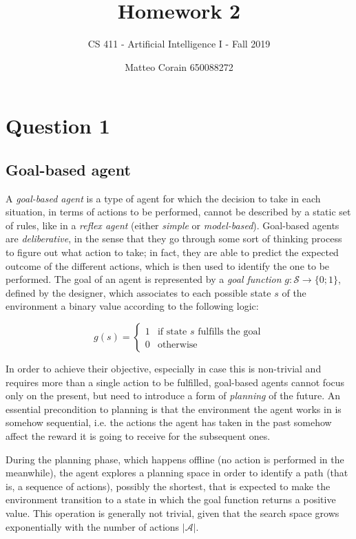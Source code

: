 \documentclass[letterpaper,headings=standardclasses]{scrartcl}
\title{Homework 2}
\subtitle{CS 411 - Artificial Intelligence I - Fall 2019}
\author{Matteo Corain 650088272}
\begin{document}
\maketitle

\section{Question 1}

\subsection{Goal-based agent}

A \emph{goal-based agent} is a type of agent for which the decision to take in each situation, in terms of actions to be performed, cannot be described by a static set of rules, like in a \emph{reflex agent} (either \emph{simple} or \emph{model-based}). Goal-based agents are \emph{deliberative}, in the sense that they go through some sort of thinking process to figure out what action to take; in fact, they are able to predict the expected outcome of the different actions, which is then used to identify the one to be performed. The goal of an agent is represented by a \emph{goal function} $g : \mathcal{S} \rightarrow \{0;1\}$, defined by the designer, which associates to each possible state $s$ of the environment a binary value according to the following logic:

$$ g(s) = \begin{cases} 1 & \text{if state } s \text{ fulfills the goal} \\ 0 & \text{otherwise}\end{cases} $$

In order to achieve their objective, especially in case this is non-trivial and requires more than a single action to be fulfilled, goal-based agents cannot focus only on the present, but need to introduce a form of \emph{planning} of the future. An essential precondition to planning is that the environment the agent works in is somehow sequential, i.e. the actions the agent has taken in the past somehow affect the reward it is going to receive for the subsequent ones.

During the planning phase, which happens offline (no action is performed in the meanwhile), the agent explores a planning space in order to identify a path (that is, a sequence of actions), possibly the shortest, that is expected to make the environment transition to a state in which the goal function returns a positive value. This operation is generally not trivial, given that the search space grows exponentially with the number of actions $|\mathcal{A}|$.
\end{document}
